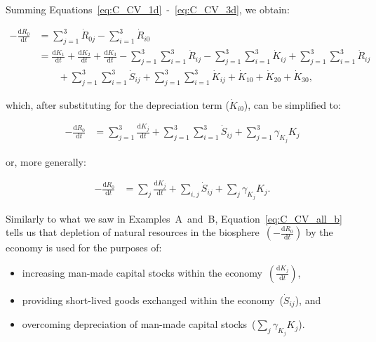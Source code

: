 Summing Equations~\ref{eq:C_CV_1d}~-~\ref{eq:C_CV_3d},
we obtain:

\begin{align}\label{eq:C_CV_all}
	- \frac{\mathrm{d}R_{0}}{\mathrm{d}t}										&
	= \sum_{j = 1}^{3}\dot{R}_{0j}
	- \sum_{i = 1}^{3}\dot{R}_{i0}									\nonumber	\\
	& =\frac{\mathrm{d}K_{1}}{\mathrm{d}t}
	+ \frac{\mathrm{d}K_{2}}{\mathrm{d}t}
	+ \frac{\mathrm{d}K_{3}}{\mathrm{d}t}
	- \sum_{j = 1}^{3}\sum_{i = 1}^{3}\dot{R}_{ij}
	- \sum_{j = 1}^{3}\sum_{i = 1}^{3}\dot{K}_{ij}
	+ \sum_{j = 1}^{3}\sum_{i = 1}^{3}\dot{R}_{ij}		\nonumber	\\
	& \qquad {} + \sum_{j = 1}^{3}\sum_{i = 1}^{3}\dot{S}_{ij}
	+ \sum_{j = 1}^{3}\sum_{i = 1}^{3}\dot{K}_{ij}
	+ \dot{K}_{10}
	+ \dot{K}_{20}
	+ \dot{K}_{30},
\end{align}

\noindent{}which,
after substituting for 
the depreciation term ($\dot{K}_{i0}$),
can be simplified to:

\begin{align}\label{eq:C_CV_all_a}
	- \frac{\mathrm{d}R_{0}}{\mathrm{d}t}										&
	=\sum_{j = 1}^{3}\frac{\mathrm{d}K_{j}}{\mathrm{d}t}
	+ \sum_{j = 1}^{3}\sum_{i = 1}^{3}\dot{S}_{ij}
	+ \sum_{j = 1}^{3}\gamma_{K_{j}}K_{j}
\end{align}

\noindent{}or,
more generally:

\begin{align}\label{eq:C_CV_all_b}
	- \frac{\mathrm{d}R_{0}}{\mathrm{d}t}										&
	=\sum_{j}\frac{\mathrm{d}K_{j}}{\mathrm{d}t}
	+ \sum_{i,j}\dot{S}_{ij}
	+ \sum_{j}\gamma_{K_{j}}K_{j}.
\end{align}

Similarly to what we saw in Examples~A~and~B,
Equation~\ref{eq:C_CV_all_b} tells us that
depletion of natural resources in the 
biosphere~$\left(- \frac{\mathrm{d}R_{0}}{\mathrm{d}t}\right)$
by the economy
is used for the purposes of:

\begin{itemize}
	\item increasing man-made capital stocks
	within the economy~$\left(\frac{\mathrm{d}K_{j}}{\mathrm{d}t}\right)$,
	\item providing short-lived goods exchanged within the
	economy~($\dot{S}_{ij}$), and
	\item overcoming depreciation of man-made
	capital stocks~($\sum_{j}\gamma_{K_{j}}K_{j}$).
\end{itemize}

